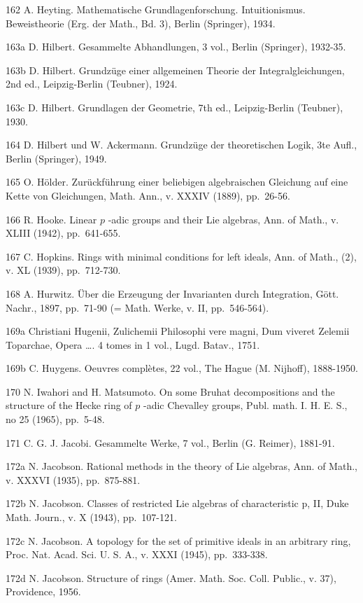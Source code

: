162 A. Heyting. Mathematische Grundlagenforschung. Intuitionismus. Beweistheorie (Erg. der Math., Bd. 3), Berlin (Springer), 1934.

163a D. Hilbert. Gesammelte Abhandlungen, 3 vol., Berlin (Springer), 1932-35.

163b D. Hilbert. Grundzüge einer allgemeinen Theorie der Integralgleichungen, 2nd ed., Leipzig-Berlin (Teubner), 1924.

163c D. Hilbert. Grundlagen der Geometrie, 7th ed., Leipzig-Berlin (Teubner), 1930.

164 D. Hilbert und W. Ackermann. Grundzüge der theoretischen Logik, 3te Aufl., Berlin (Springer), 1949.

165 O. Hölder. Zurückführung einer beliebigen algebraischen Gleichung auf eine Kette von Gleichungen, Math. Ann., v. XXXIV (1889), pp.~26-56.

166 R. Hooke. Linear \(p\) -adic groups and their Lie algebras, Ann. of Math., v. XLIII (1942), pp.~641-655.

167 C. Hopkins. Rings with minimal conditions for left ideals, Ann. of Math., (2), v. XL (1939), pp.~712-730.

168 A. Hurwitz. Über die Erzeugung der Invarianten durch Integration, Gött. Nachr., 1897, pp.~71-90 (= Math. Werke, v. II, pp.~546-564).

169a Christiani Hugenii, Zulichemii Philosophi vere magni, Dum viveret Zelemii Toparchae, Opera \ldots. 4 tomes in 1 vol., Lugd. Batav., 1751.

169b C. Huygens. Oeuvres complètes, 22 vol., The Hague (M. Nijhoff), 1888-1950.

170 N. Iwahori and H. Matsumoto. On some Bruhat decompositions and the structure of the Hecke ring of \(p\) -adic Chevalley groups, Publ. math. I. H. E. S., no 25 (1965), pp.~5-48.

171 C. G. J. Jacobi. Gesammelte Werke, 7 vol., Berlin (G. Reimer), 1881-91.

172a N. Jacobson. Rational methods in the theory of Lie algebras, Ann. of Math., v. XXXVI (1935), pp.~875-881.

172b N. Jacobson. Classes of restricted Lie algebras of characteristic p, II, Duke Math. Journ., v. X (1943), pp.~107-121.

172c N. Jacobson. A topology for the set of primitive ideals in an arbitrary ring, Proc. Nat. Acad. Sci. U. S. A., v. XXXI (1945), pp.~333-338.

172d N. Jacobson. Structure of rings (Amer. Math. Soc. Coll. Public., v. 37), Providence, 1956.

